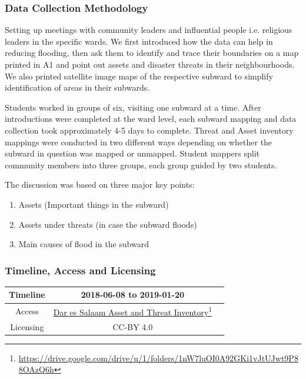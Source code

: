\documentclass[a4paper,12pt,twoside]{article}
\begin{document}
\subsubsection{Data Collection Methodology}
\begin{multicols}{2}
Setting up meetings with community leaders and influential people i.e. religious leaders in the specific wards. We first introduced how the data can help in reducing flooding, then ask them to identify and trace their boundaries on a map printed in A1 and point out assets and disaster threats in their neighbourhoods. We also printed satellite image maps of the respective subward to simplify identification of areas in their subwards.

Students worked in groups of six, visiting one subward at a time. After introductions were completed at the ward level, each subward mapping and data collection took approximately  4-5 days to complete. Threat and Asset inventory mappings were conducted in two different ways depending on whether the subward in question was mapped or unmapped. Student mappers split community members into three groups, each group guided by two students.
\end{multicols}


The discussion was based on three major key points:
\begin{enumerate}
    \item Assets (Important things in the subward)
    \item Assets under threats (in case the subward floods)
    \item Main causes of flood in the subward
\end{enumerate}

\medskip
\subsubsection{Timeline, Access and Licensing}
\begin{center}
\begin{tabular}{|c|c|c|}  
 \hline
  Timeline  &   2018-06-08 to 2019-01-20 \\
\hline  
 Access  & 
    \href{https://drive.google.com/drive/u/1/folders/1nW7luOI0A92GKi1vJtUJwt9P88OAzQ6h}{Dar es Salaam Asset and Threat Inventory}\footnote{\url{https://drive.google.com/drive/u/1/folders/1nW7luOI0A92GKi1vJtUJwt9P88OAzQ6h}} \\
   
\hline 
    Licensing &  CC-BY 4.0 \\
\hline
\end{tabular}
\end{center}
\end{document}
